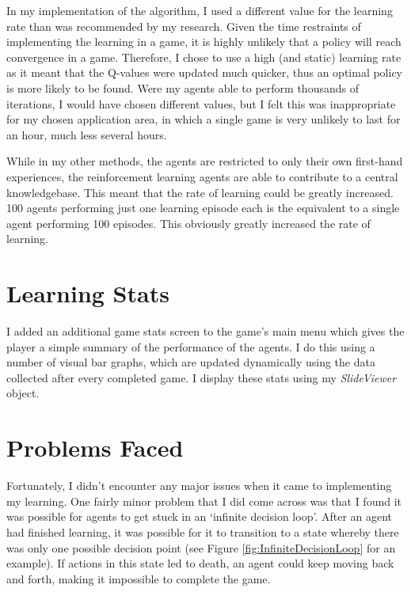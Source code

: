 \documentclass[a4paper,oneside]{report}
\begin{document}
In my implementation of the algorithm, I used a different value for the learning rate than was recommended by my research. Given the time restraints of implementing the learning in a game, it is highly unlikely that a policy will reach convergence in a game. Therefore, I chose to use a high (and static) learning rate as it meant that the Q-values were updated much quicker, thus an optimal policy is more likely to be found. Were my agents able to perform thousands of iterations, I would have chosen different values, but I felt this was inappropriate for my chosen application area, in which a single game is very unlikely to last for an hour, much less several hours.

While in my other methods, the agents are restricted to only their own first-hand experiences, the reinforcement learning agents are able to contribute to a central knowledgebase. This meant that the rate of learning could be greatly increased. 100 agents performing just one learning episode each is the equivalent to a single agent performing 100 episodes. This obviously greatly increased the rate of learning.

\section{Learning Stats}

I added an additional game stats screen to the game's main menu which gives the player a simple summary of the performance of the agents. I do this using a number of visual bar graphs, which are updated dynamically using the data collected after every completed game. I display these stats using my \emph{SlideViewer} object.

\section{Problems Faced}
	
Fortunately, I didn't encounter any major issues when it came to implementing my learning. One fairly minor problem that I did come across was that I found it was possible for agents to get stuck in an `infinite decision loop'. After an agent had finished learning, it was possible for it to transition to a state whereby there was only one possible decision point (see Figure \ref{fig:InfiniteDecisionLoop} for an example). If actions in this state led to death, an agent could keep moving back and forth, making it impossible to complete the game.
\end{document}
